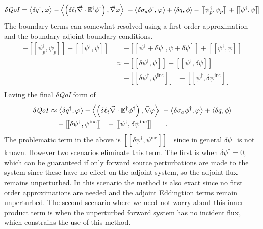 \documentclass[12pt]{report}
\newcommand{\bra}{\left\langle}
\newcommand{\ket}{\right\rangle}
\newcommand{\sbraSN}{\left[ \! \left[}
\newcommand{\sketSN}{\right] \! \right]}
\renewcommand{\div}{\vec{\nabla} \cdot}
\newcommand{\grad}{\vec{\nabla}}
\newcommand{\Edd}{\mathbb{E}}
\newcommand{\siga}{\sigma_a}
\newcommand{\isigt}{\ell_t}
\newcommand{\qoi}{{\it QoI}\xspace}
\begin{document}
\begin{equation}
\label{AltVETsensA}
\delta \qoi = \bra \delta q^\dag, \varphi \ket - \bra\left( \delta \isigt \div \Edd^\dag \phi^\dag  \right), \grad \varphi \ket \
- \bra \delta \siga \phi^\dag , \varphi \ket + \bra \delta q , \phi \ket - \sbraSN \psi^\dag_p,  \psi_p \sketSN + \sbraSN \psi^\dag,  \psi \sketSN
\end{equation}
The boundary terms can somewhat resolved using a first order approximation and the boundary adjoint boundary conditions.
\begin{equation}
\begin{split}
- \sbraSN \psi^\dag_p,  \psi_p \sketSN + \sbraSN \psi^\dag,  \psi \sketSN
&= - \sbraSN \psi^\dag+\delta \psi^\dag,  \psi + \delta \psi \sketSN + \sbraSN \psi^\dag,  \psi \sketSN \\
&\approx - \sbraSN \delta \psi^\dag,  \psi \sketSN - \sbraSN \psi^\dag,  \delta \psi \sketSN \\
&= - \sbraSN \delta \psi^\dag,  \psi^{\text{inc}} \sketSN_- - \sbraSN \psi^\dag,  \delta \psi^{\text{inc}} \sketSN_- \\
\end{split}
\end{equation}
Laving the final $\delta$\qoi form of
\begin{equation}
\label{AltVETsens}
\begin{split}
\delta \qoi &\approx \bra \delta q^\dag, \varphi \ket - \bra\left( \delta \isigt \div \Edd^\dag \phi^\dag  \right), \grad \varphi \ket \
- \bra \delta \siga \phi^\dag , \varphi \ket + \bra \delta q , \phi \ket \\
& \quad - \sbraSN \delta \psi^\dag,  \psi^{\text{inc}} \sketSN_- - \sbraSN \psi^\dag,  \delta \psi^{\text{inc}} \sketSN_- \quad . 
\end{split}
\end{equation}
The problematic term in the above is $\sbraSN \delta \psi^\dag,  \psi^{\text{inc}} \sketSN_-$ since in general $\delta \psi^\dag$ is not known. However two scenarios eliminate this term. The first is when $\delta \psi^\dag=0$, which can be guaranteed if only forward source perturbations are made to the system since these have no effect on the adjoint system, so the adjoint flux remains unperturbed. In this scenario the method is also exact since no first order approximations are needed and the adjoint Eddingtion terms remain unperturbed. The second scenario where we need not worry about this inner-product term is when the unperturbed forward system has no incident flux, which constrains the use of this method.
\end{document}
